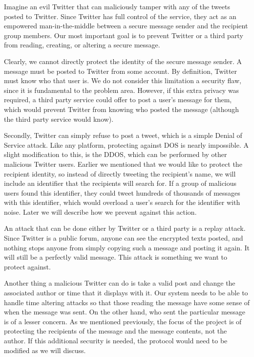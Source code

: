\documentclass{article}
\begin{document}
Imagine an evil Twitter that can maliciously tamper with any of the tweets posted to Twitter. Since Twitter has full control of the service, they act as an empowered man-in-the-middle between a secure message sender and the recipient group members. Our most important goal is to prevent Twitter or a third party from reading, creating, or altering a secure message.

Clearly, we cannot directly protect the identity of the secure message sender. A message must be posted to Twitter from some account. By definition, Twitter must know who that user is. We do not consider this limitation a security flaw, since it is fundamental to the problem area. However, if this extra privacy was required, a third party service could offer to post a user's message for them, which would prevent Twitter from knowing who posted the message (although the third party service would know).

Secondly, Twitter can simply refuse to post a tweet, which is a simple Denial of Service attack. Like any platform, protecting against DOS is nearly impossible. A slight modification to this, is the DDOS, which can be performed by other malicious Twitter users. Earlier we mentioned that we would like to protect the recipient identity, so instead of directly tweeting the recipient's name, we will include an identifier that the recipients will search for. If a group of malicious users found this identifier, they could tweet hundreds of thousands of messages with this identifier, which would overload a user's search for the identifier with noise. Later we will describe how we prevent against this action.

An attack that can be done either by Twitter or a third party is a replay attack. Since Twitter is a public forum, anyone can see the encrypted texts posted, and nothing stops anyone from simply copying such a message and posting it again. It will still be a perfectly valid message. This attack is something we want to protect against.

Another thing a malicious Twitter can do is take a valid post and change the associated author or time that it displays with it. Our system needs to be able to handle time altering attacks so that those reading the message have some sense of when the message was sent. On the other hand, who sent the particular message is of a lesser concern. As we mentioned previously, the focus of the project is of protecting the recipients of the message and the message contents, not the author. If this additional security is needed, the protocol would need to be modified as we will discuss.
\end{document}
